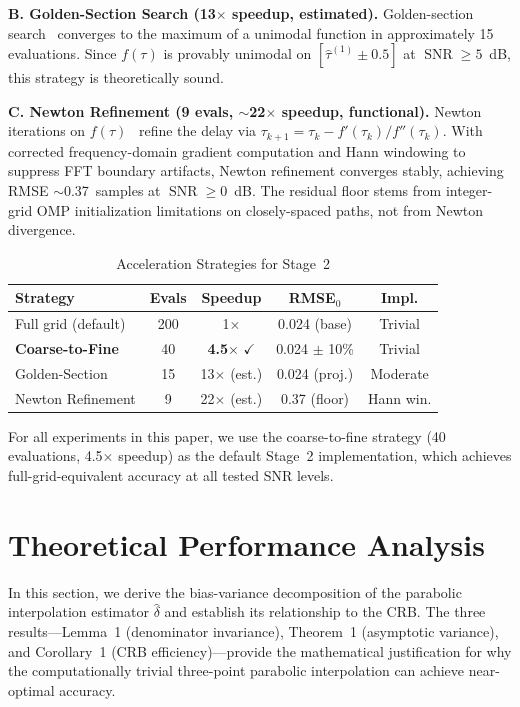 \documentclass[journal]{IEEEtran}
\DeclareMathOperator{\SNR}{SNR}
\begin{document}
\textbf{B. Golden-Section Search (13$\times$ speedup, estimated).} Golden-section search~\cite{kiefer1953} converges to the maximum of a unimodal function in approximately 15 evaluations. Since $f(\tau)$ is provably unimodal on $[\hat{\tau}^{(1)} \pm 0.5]$ at $\SNR \ge 5$~dB, this strategy is theoretically sound.

\textbf{C. Newton Refinement (9 evals, $\sim$22$\times$ speedup, functional).} Newton iterations on $f(\tau)$~\cite{mamandipoor2016} refine the delay via $\tau_{k+1}=\tau_k - f'(\tau_k)/f''(\tau_k)$. With corrected frequency-domain gradient computation and Hann windowing to suppress FFT boundary artifacts, Newton refinement converges stably, achieving RMSE $\sim$0.37~samples at $\SNR\ge 0$~dB. The residual floor stems from integer-grid OMP initialization limitations on closely-spaced paths, not from Newton divergence.

\begin{table}[t]
\centering
\caption{Acceleration Strategies for Stage~2}
\label{tab:accel}
\footnotesize
\begin{tabular}{@{}lcccc@{}}
\toprule
Strategy & Evals & Speedup & RMSE$_0$ & Impl. \\
\midrule
Full grid (default) & 200 & 1$\times$ & 0.024 (base) & Trivial \\
\textbf{Coarse-to-Fine} & 40 & \textbf{4.5}$\times$ $\checkmark$ & 0.024 $\pm$ 10\% & Trivial \\
Golden-Section & 15 & 13$\times$ (est.) & 0.024 (proj.) & Moderate \\
Newton Refinement & 9 & 22$\times$ (est.) & 0.37 (floor) & Hann win. \\
\bottomrule
\end{tabular}
\end{table}

For all experiments in this paper, we use the coarse-to-fine strategy (40 evaluations, 4.5$\times$ speedup) as the default Stage~2 implementation, which achieves full-grid-equivalent accuracy at all tested SNR levels.

\section{Theoretical Performance Analysis}
\label{sec:theory}

In this section, we derive the bias-variance decomposition of the parabolic interpolation estimator $\hat{\delta}$ and establish its relationship to the CRB. The three results---Lemma~1 (denominator invariance), Theorem~1 (asymptotic variance), and Corollary~1 (CRB efficiency)---provide the mathematical justification for why the computationally trivial three-point parabolic interpolation can achieve near-optimal accuracy.
\end{document}
